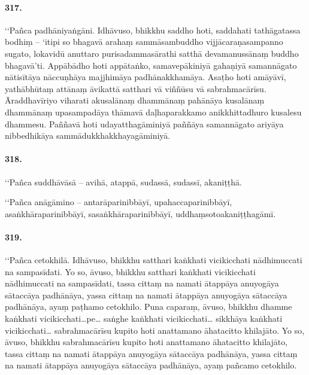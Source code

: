\paragraph{317.} ‘‘Pañca padhāniyaṅgāni. Idhāvuso, bhikkhu saddho hoti, saddahati tathāgatassa bodhiṃ – ‘itipi so bhagavā arahaṃ sammāsambuddho vijjācaraṇasampanno sugato, lokavidū anuttaro purisadammasārathi satthā devamanussānaṃ buddho bhagavā’ti. Appābādho hoti appātaṅko, samavepākiniyā gahaṇiyā samannāgato nātisītāya nāccuṇhāya majjhimāya padhānakkhamāya. Asaṭho hoti amāyāvī, yathābhūtaṃ attānaṃ āvikattā satthari vā viññūsu vā sabrahmacārīsu. Āraddhavīriyo viharati akusalānaṃ dhammānaṃ pahānāya kusalānaṃ dhammānaṃ upasampadāya thāmavā daḷhaparakkamo anikkhittadhuro kusalesu dhammesu. Paññavā hoti udayatthagāminiyā paññāya samannāgato ariyāya nibbedhikāya sammādukkhakkhayagāminiyā.

\paragraph{318.} ‘‘Pañca suddhāvāsā – avihā, atappā, sudassā, sudassī, akaniṭṭhā.

‘‘Pañca anāgāmino – antarāparinibbāyī, upahaccaparinibbāyī, asaṅkhāraparinibbāyī, sasaṅkhāraparinibbāyī, uddhaṃsotoakaniṭṭhagāmī.

\paragraph{319.} ‘‘Pañca cetokhilā. Idhāvuso, bhikkhu satthari kaṅkhati vicikicchati nādhimuccati na sampasīdati. Yo so, āvuso, bhikkhu satthari kaṅkhati vicikicchati nādhimuccati na sampasīdati, tassa cittaṃ na namati ātappāya anuyogāya sātaccāya padhānāya, yassa cittaṃ na namati ātappāya anuyogāya sātaccāya padhānāya, ayaṃ paṭhamo cetokhilo. Puna caparaṃ, āvuso, bhikkhu dhamme kaṅkhati vicikicchati…pe… saṅghe kaṅkhati vicikicchati… sikkhāya kaṅkhati vicikicchati… sabrahmacārīsu kupito hoti anattamano āhatacitto khilajāto. Yo so, āvuso, bhikkhu sabrahmacārīsu kupito hoti anattamano āhatacitto khilajāto, tassa cittaṃ na namati ātappāya anuyogāya sātaccāya padhānāya, yassa cittaṃ na namati ātappāya anuyogāya sātaccāya padhānāya, ayaṃ pañcamo cetokhilo.

